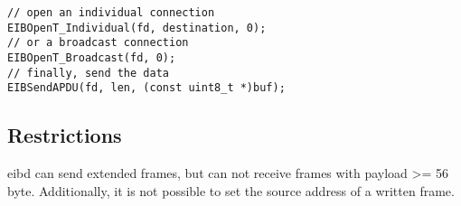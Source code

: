 \begin{lstlisting}[style=cStyle,caption={Writing to \gls{knx} frames},label=lst:knxWrite]
// open an individual connection
EIBOpenT_Individual(fd, destination, 0);
// or a broadcast connection
EIBOpenT_Broadcast(fd, 0);
// finally, send the data
EIBSendAPDU(fd, len, (const uint8_t *)buf);
\end{lstlisting}

\subsection{Restrictions }

\gls{eibd} can send extended frames, but can not receive frames with payload >= 56 byte. Additionally, it is not possible to set the source address of a written frame.  

